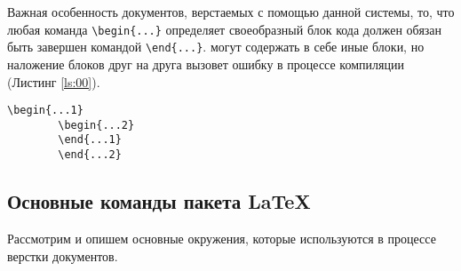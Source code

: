     Важная особенность документов, верстаемых с помощью данной системы, то, что любая команда \verb|\begin{...}| определяет своеобразный блок кода должен обязан быть завершен командой \verb|\end{...}|. \guillemotright  могут содержать в себе иные блоки, но наложение блоков друг на друга вызовет ошибку в процессе компиляции (Листинг \ref{ls:00}).

    \begin{lstlisting}[language=Tex, caption={Данный порядок команд вызовает ошибку компиляции}, label={ls:00}]
        \begin{...1}
        \begin{...2}
        \end{...1}
        \end{...2}
    \end{lstlisting}

\subsection{Основные команды пакета \LaTeX}
    Рассмотрим и опишем основные окружения, которые используются в процессе верстки документов.
    
